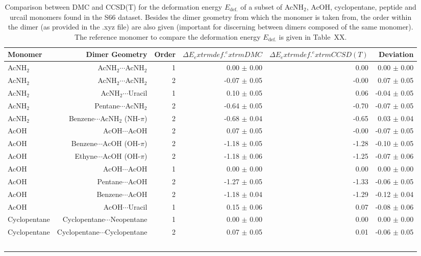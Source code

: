 \begin{table}
\caption{\label{tab:monomer_deformation_ene}Comparison between DMC and CCSD(T) for the deformation energy $E_\textrm{def.}$ of a subset of AcNH$_2$, AcOH, cyclopentane, peptide and urcail monomers found in the S66 dataset. Besides the dimer geometry from which the monomer is taken from, the order within the dimer (as provided in the .xyz file) are also given (important for discerning between dimers composed of the same monomer). The reference monomer to compare the deformation energy $E_\textrm{def.}$ is given in Table~XX.}
\begin{adjustbox}{center}
\begin{tabular}{lrrrrr}
\toprule
Monomer & Dimer Geometry & Order & $\Delta E_	extrm{def.}^	extrm{DMC}$ & $\Delta E_	extrm{def.}^	extrm{CCSD(T)}$ & Deviation \\ 
\midrule
AcNH$_2$ & AcNH$_2$$\cdots$AcNH$_2$ & 1 & 0.00 $\pm$ 0.00 & 0.00 & 0.00 $\pm$ 0.00 \\
AcNH$_2$ & AcNH$_2$$\cdots$AcNH$_2$ & 2 & -0.07 $\pm$ 0.05 & -0.00 & 0.07 $\pm$ 0.05 \\
AcNH$_2$ & AcNH$_2$$\cdots$Uracil & 1 & 0.10 $\pm$ 0.05 & 0.06 & -0.04 $\pm$ 0.05 \\
AcNH$_2$ & Pentane$\cdots$AcNH$_2$ & 2 & -0.64 $\pm$ 0.05 & -0.70 & -0.07 $\pm$ 0.05 \\
AcNH$_2$ & Benzene$\cdots$AcNH$_2$ (NH-$\pi$) & 2 & -0.68 $\pm$ 0.04 & -0.65 & 0.03 $\pm$ 0.04 \\
AcOH & AcOH$\cdots$AcOH & 2 & 0.07 $\pm$ 0.05 & -0.00 & -0.07 $\pm$ 0.05 \\
AcOH & Benzene$\cdots$AcOH (OH-$\pi$) & 2 & -1.18 $\pm$ 0.05 & -1.28 & -0.10 $\pm$ 0.05 \\
AcOH & Ethyne$\cdots$AcOH (OH-$\pi$) & 2 & -1.18 $\pm$ 0.06 & -1.25 & -0.07 $\pm$ 0.06 \\
AcOH & AcOH$\cdots$AcOH & 1 & 0.00 $\pm$ 0.00 & 0.00 & 0.00 $\pm$ 0.00 \\
AcOH & Pentane$\cdots$AcOH & 2 & -1.27 $\pm$ 0.05 & -1.33 & -0.06 $\pm$ 0.05 \\
AcOH & Benzene$\cdots$AcOH & 2 & -1.18 $\pm$ 0.04 & -1.29 & -0.12 $\pm$ 0.04 \\
AcOH & AcOH$\cdots$Uracil & 1 & 0.15 $\pm$ 0.06 & 0.07 & -0.08 $\pm$ 0.06 \\
Cyclopentane & Cyclopentane$\cdots$Neopentane & 1 & 0.00 $\pm$ 0.00 & 0.00 & 0.00 $\pm$ 0.00 \\
Cyclopentane & Cyclopentane$\cdots$Cyclopentane & 2 & 0.07 $\pm$ 0.05 & 0.01 & -0.06 $\pm$ 0.05 \\
$$
\end{tabular}
\end{adjustbox}
\end{table}
